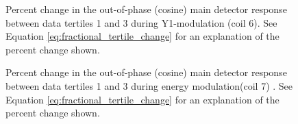 \begin{figure}[h]

\centering
{}
\caption{Percent change in the out-of-phase (cosine) main detector response between data tertiles 1 and 3 during Y1-modulation (coil 6). See Equation \ref{eq:fractional_tertile_change} for an explanation of the percent change shown.}
\label{fig:tert_md_coeff_coil6}
\end{figure}
\begin{figure}[h]

\centering
{}
\caption{Percent change in the out-of-phase (cosine) main detector response between data tertiles 1 and 3 during energy modulation(coil 7) . See Equation \ref{eq:fractional_tertile_change} for an explanation of the percent change shown.}
\label{fig:tert_md_coeff_coil7}
\end{figure}
